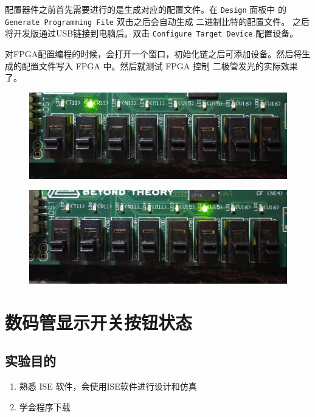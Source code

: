 \documentclass{ctexart}
\begin{document}
        配置器件之前首先需要进行的是生成对应的配置文件。在 \verb|Design| 面板中
        的 \verb|Generate Programming File|  双击之后会自动生成 二进制比特的配置文件。
        之后将开发版通过USB链接到电脑后。双击 \verb|Configure Target Device| 配置设备。

        对FPGA配置编程的时候，会打开一个窗口，初始化链之后可添加设备。然后将生成的配置文件写入
        FPGA 中。然后就测试 FPGA 控制 二极管发光的实际效果了。

        \begin{figure}
\centering
\includegraphics[width=1\linewidth]{report-1-rt-1}
\caption{}
\label{fig:report-1-rt-1}
\end{figure}
\begin{figure}
\centering
\includegraphics[width=1\linewidth]{report-1-rt-2}
\caption{}
\label{fig:report-1-rt-2}
\end{figure}

        
         \section{数码管显示开关按钮状态}
         
         \subsection{实验目的}
         \begin{enumerate}
             \item 熟悉 ISE 软件，会使用ISE软件进行设计和仿真
             \item 学会程序下载
            \end{enumerate}
            
\end{document}
